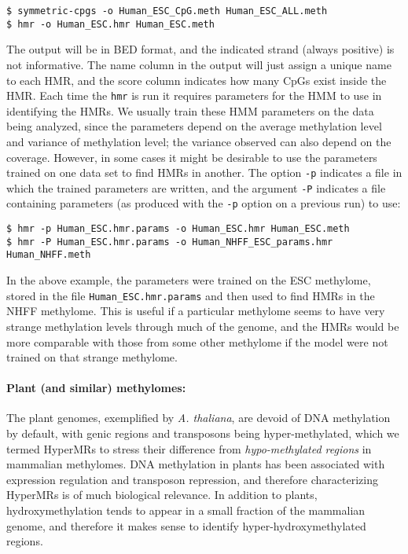 \documentclass[10pt]{article}
\newcommand{\prog}[1]{\texttt{#1}}
\newcommand{\fn}[1]{\texttt{#1}}
\newcommand{\op}[1]{\texttt{#1}}
\begin{document}
\begin{verbatim}
$ symmetric-cpgs -o Human_ESC_CpG.meth Human_ESC_ALL.meth
$ hmr -o Human_ESC.hmr Human_ESC.meth
\end{verbatim}

The output will be in BED format, and the indicated strand (always
positive) is not informative. The name column in the output will just
assign a unique name to each HMR, and the score column indicates how
many CpGs exist inside the HMR. Each time the \prog{hmr} is run it
requires parameters for the HMM to use in identifying the HMRs. We
usually train these HMM parameters on the data being analyzed, since
the parameters depend on the average methylation level and variance of
methylation level; the variance observed can also depend on the
coverage. However, in some cases it might be desirable to use the
parameters trained on one data set to find HMRs in another. The option
\op{-p} indicates a file in which the trained parameters are written,
and the argument \op{-P} indicates a file containing parameters (as
produced with the \op{-p} option on a previous run) to use:

\begin{verbatim}
$ hmr -p Human_ESC.hmr.params -o Human_ESC.hmr Human_ESC.meth
$ hmr -P Human_ESC.hmr.params -o Human_NHFF_ESC_params.hmr Human_NHFF.meth
\end{verbatim}

In the above example, the parameters were trained on the ESC
methylome, stored in the file \fn{Human\_ESC.hmr.params} and then
used to find HMRs in the NHFF methylome.
This is useful if a particular methylome
seems to have very strange methylation levels through much of the
genome, and the HMRs would be more comparable with those from some
other methylome if the model were not trained on that strange
methylome.

\paragraph{Plant (and similar) methylomes:} 
The plant genomes, exemplified by \textit{A. thaliana}, are devoid of
DNA methylation by default, with genic regions and transposons being
hyper-methylated, which we termed HyperMRs to stress their difference
from \textit{hypo-methylated regions} in mammalian methylomes. DNA
methylation in plants has been associated with expression regulation
and transposon repression, and therefore characterizing HyperMRs is of
much biological relevance. In addition to plants, hydroxymethylation
tends to appear in a small fraction of the mammalian genome, and therefore
it makes sense to identify hyper-hydroxymethylated regions.
\end{document}
